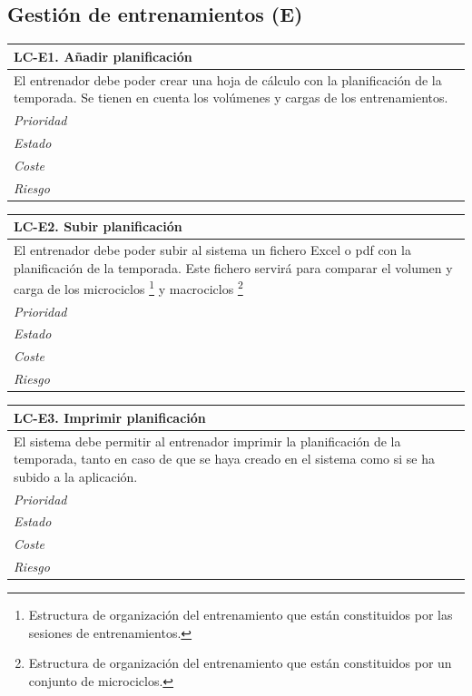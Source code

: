 
%
%
\subsection{Gestión de entrenamientos (E)} %
	\label{sub:gestion_de_entrenamientos}

	\begin{center}
		\begin{tabularx}{15cm}{|X|}
			\hline 
				\bf{LC-E1. Añadir planificación}\\
			\hline
				El entrenador debe poder crear una hoja de cálculo con la planificación de la temporada. Se tienen en cuenta los volúmenes y cargas de los entrenamientos.\\
			\hline
				\it{Prioridad}\\
			\hline
				\it{Estado}\\
			\hline
				\it{Coste}\\
			\hline
				\it{Riesgo}\\
			\hline
		\end{tabularx}
	\end{center}
	
	\begin{center}
		\begin{tabularx}{15cm}{|X|}
			\hline 
				\bf{LC-E2. Subir planificación}\\
			\hline
				El entrenador debe poder subir al sistema un fichero Excel o pdf con la planificación de la temporada. Este fichero servirá para comparar el volumen y carga de los microciclos \footnote{Estructura de organización del entrenamiento que están constituidos por las sesiones de entrenamientos.} y macrociclos \footnote{Estructura de organización del entrenamiento que están constituidos por un conjunto de microciclos.}\\
			\hline
				\it{Prioridad}\\
			\hline
				\it{Estado}\\
			\hline
				\it{Coste}\\
			\hline
				\it{Riesgo}\\
			\hline
		\end{tabularx}
	\end{center}
	
	\begin{center}
		\begin{tabularx}{15cm}{|X|}
			\hline 
				\bf{LC-E3. Imprimir planificación}\\
			\hline
				El sistema debe permitir al entrenador imprimir la planificación de la temporada, tanto en caso de que se haya creado en el sistema como si se ha subido a la aplicación.\\
			\hline
				\it{Prioridad}\\
			\hline
				\it{Estado}\\
			\hline
				\it{Coste}\\
			\hline
				\it{Riesgo}\\
			\hline
		\end{tabularx}
	\end{center}
	
